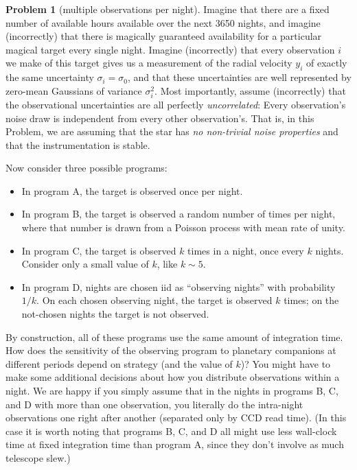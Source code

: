 \documentclass{article}
\theoremstyle{definition}
\newcommand{\problemname}{Problem}
\newtheorem{problem}{\problemname}
\theoremstyle{remark}
\begin{document}
\begin{problem}[multiple observations per night]\label{prob:k}
Imagine that there are a fixed number of available hours available over the next 3650 nights, and imagine (incorrectly) that there is magically guaranteed availability for a particular magical target every single night.
Imagine (incorrectly) that every observation $i$ we make of this target gives us a measurement of the radial velocity $y_i$ of exactly the same uncertainty $\sigma_i=\sigma_0$, and that these uncertainties are well represented by zero-mean Gaussians of variance $\sigma_i^2$.
Most importantly, assume (incorrectly) that the observational uncertainties are all perfectly \emph{uncorrelated}:
Every observation's noise draw is independent from every other observation's.
That is, in this \problemname{}, we are assuming that the star has \emph{no non-trivial noise properties} and that the instrumentation is stable.

Now consider three possible programs:
\begin{itemize}
\item
In program A, the target is observed once per night.
\item
In program B, the target is observed a random number of times per night, where that number is drawn from a Poisson process with mean rate of unity.
\item
In program C, the target is observed $k$ times in a night, once every $k$ nights. Consider only a small value of $k$, like $k\sim 5$.
\item
In program D, nights are chosen iid as ``observing nights'' with probability $1/k$.
On each chosen observing night, the target is observed $k$ times; on the not-chosen nights the target is not observed.
\end{itemize}
By construction, all of these programs use the same amount of integration time.
How does the sensitivity of the observing program to planetary companions at different periods depend on strategy (and the value of $k$)?
You might have to make some additional decisions about how you distribute observations within a night.
We are happy if you simply assume that in the nights in programs B, C, and D with more than one observation, you literally do the intra-night observations one right after another (separated only by CCD read time).
(In this case it is worth noting that programs B, C, and D all might use less wall-clock time at fixed integration time than program A, since they don't involve as much telescope slew.)
\end{problem}
\end{document}
